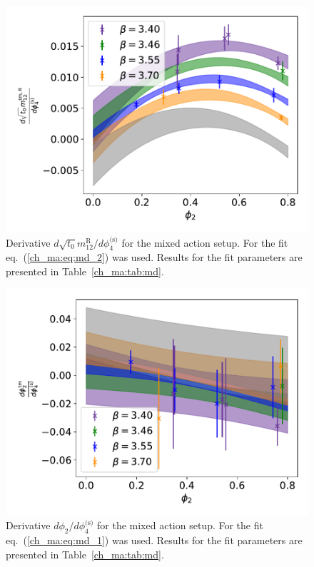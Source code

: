 \begin{figure}
    \centering
    \includegraphics[width=1.\textwidth]{./cap4/figs/dt0m12_tm.pdf}
    \caption{Derivative $d\sqrt{t_0}m_{12}^{\textrm{R}}/d\phi_4^{\textrm{(s)}}$ for the mixed action setup. For the fit eq.~(\ref{ch_ma:eq:md_2}) was used. Results for the fit parameters are presented in Table~\ref{ch_ma:tab:md}.}
    \label{ch_ma:fig:dm12_tm}
\end{figure}

\begin{figure}
    \centering
    \includegraphics[width=1.\textwidth]{./cap4/figs/dphi2_tm.pdf}
    \caption{Derivative $d\phi_2/d\phi_4^{\textrm{(s)}}$ for the mixed action setup. For the fit eq.~(\ref{ch_ma:eq:md_1}) was used. Results for the fit parameters are presented in Table~\ref{ch_ma:tab:md}.}
    \label{ch_ma:fig:dphi2_tm}
\end{figure}

